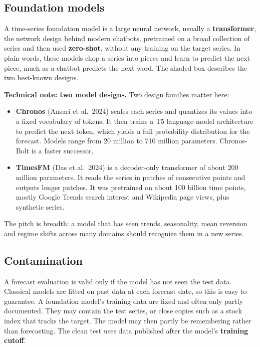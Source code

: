\subsection{Foundation models}
\label{sec:21-fm}

A time-series foundation model is a large neural network, usually a \textbf{transformer}, the network design behind modern chatbots, pretrained on a broad collection of series and then used \textbf{zero-shot}, without any training on the target series. In plain words, these models chop a series into pieces and learn to predict the next piece, much as a chatbot predicts the next word. The shaded box describes the two best-known designs.

\begin{technote}
\textbf{Technical note: two model designs.} Two design families matter here:

\begin{itemize}
  \item \textbf{Chronos} (Ansari et al.\ 2024) scales each series and quantizes its values into a fixed vocabulary of tokens. It then trains a T5 language-model architecture to predict the next token, which yields a full probability distribution for the forecast. Models range from 20 million to 710 million parameters. Chronos-Bolt is a faster successor.
  \item \textbf{TimesFM} (Das et al.\ 2024) is a decoder-only transformer of about 200 million parameters. It reads the series in patches of consecutive points and outputs longer patches. It was pretrained on about 100 billion time points, mostly Google Trends search interest and Wikipedia page views, plus synthetic series.
\end{itemize}
\end{technote}

The pitch is breadth: a model that has seen trends, seasonality, mean reversion and regime shifts across many domains should recognize them in a new series.

\subsection{Contamination}
\label{sec:21-contam}

A forecast evaluation is valid only if the model has not seen the test data. Classical models are fitted on past data at each forecast date, so this is easy to guarantee. A foundation model's training data are fixed and often only partly documented. They may contain the test series, or close copies such as a stock index that tracks the target. The model may then partly be remembering rather than forecasting. The clean test uses data published after the model's \textbf{training cutoff}.


